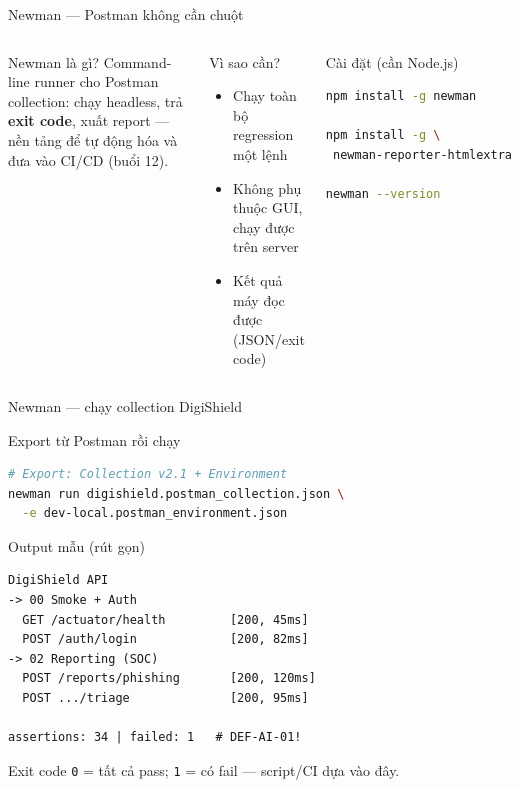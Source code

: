 \documentclass[aspectratio=169,12pt]{beamer}
\begin{document}
\begin{frame}[fragile]{Newman --- Postman không cần chuột}
  \begin{columns}[T]
    \begin{block}{Newman là gì?}
      Command-line runner cho Postman collection: chạy headless,
      trả \textbf{exit code}, xuất report --- nền tảng để tự động hóa
      và đưa vào CI/CD (buổi 12).
    \end{block}

    \begin{block}{Vì sao cần?}
      \begin{itemize}
        \item Chạy toàn bộ regression một lệnh
        \item Không phụ thuộc GUI, chạy được trên server
        \item Kết quả máy đọc được (JSON/exit code)
      \end{itemize}
    \end{block}

    \begin{block}{Cài đặt (cần Node.js)}
\begin{lstlisting}[language=bash]
npm install -g newman

npm install -g \
 newman-reporter-htmlextra

newman --version
\end{lstlisting}
    \end{block}
  \end{columns}
\end{frame}

\begin{frame}[fragile]{Newman --- chạy collection DigiShield}
  \begin{block}{Export từ Postman rồi chạy}
\begin{lstlisting}[language=bash,basicstyle=\ttfamily\scriptsize]
# Export: Collection v2.1 + Environment
newman run digishield.postman_collection.json \
  -e dev-local.postman_environment.json
\end{lstlisting}
  \end{block}

  \begin{block}{Output mẫu (rút gọn)}
\begin{lstlisting}[language={},basicstyle=\ttfamily\scriptsize]
DigiShield API
-> 00 Smoke + Auth
  GET /actuator/health         [200, 45ms]
  POST /auth/login             [200, 82ms]
-> 02 Reporting (SOC)
  POST /reports/phishing       [200, 120ms]
  POST .../triage              [200, 95ms]

assertions: 34 | failed: 1   # DEF-AI-01!
\end{lstlisting}
  \end{block}

  \begin{block}{Exit code}
    \texttt{0} = tất cả pass; \texttt{1} = có fail --- script/CI dựa vào đây.
  \end{block}
\end{frame}
\end{document}
